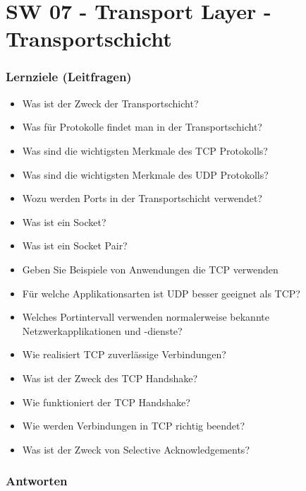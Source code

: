 \part{SW 07 - Transport Layer - Transportschicht}
\section{Lernziele (Leitfragen)}
\begin{itemize}
    \item Was ist der Zweck der Transportschicht?
    \item Was für Protokolle findet man in der Transportschicht?
    \item Was sind die wichtigsten Merkmale des TCP Protokolls?
    \item Was sind die wichtigsten Merkmale des UDP Protokolls?
    \item Wozu werden Ports in der Transportschicht verwendet?
    \item Was ist ein Socket?
    \item Was ist ein \flqq{}Socket Pair\frqq?
    \item Geben Sie Beispiele von Anwendungen die TCP verwenden
    \item Für welche Applikationsarten ist UDP besser geeignet als TCP?
    \item Welches Portintervall verwenden normalerweise bekannte Netzwerkapplikationen und -dienste?
    \item Wie realisiert TCP zuverlässige Verbindungen?
    \item Was ist der Zweck des TCP Handshake?
    \item Wie funktioniert der TCP Handshake?
    \item Wie werden Verbindungen in TCP richtig beendet?
    \item Was ist der Zweck von \flqq{}Selective Acknowledgements\frqq?
\end{itemize}

\section{Antworten}
